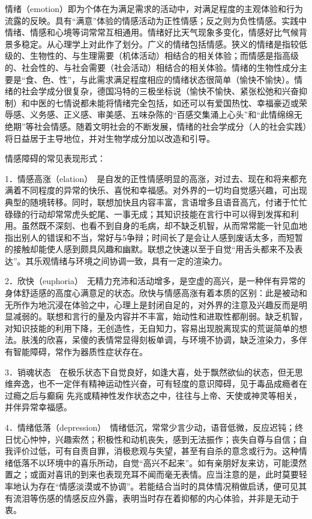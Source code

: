 情绪（emotion）即为个体在为满足需求的活动中，对满足程度的主观体验和行为流露的反映。具有“满意”体验的情感活动为正性情感；反之则为负性情感。实践中情绪、情感和心境等词常常互相通用。情绪好比天气现象多变化，情感好比气候背景多稳定。从心理学上对此作了划分。广义的情绪包括情感。狭义的情绪是指较低级的、生物性的、与生理需要（机体活动）相结合的相关体验；而情感是指高级的、社会性的、与社会需要（社会活动）相结合的相关体验。情绪的生物性成分主要是“食、色、性”，与此需求满足程度相应的情绪状态很简单（愉快不愉快）。情绪的社会学成分很复杂，德国冯特的三极坐标说（愉快不愉快、紧张松弛和兴奋抑制）和中医的七情说都未能将情绪完全包括，如还可以有爱国热忱、幸福豪迈或荣辱感、义务感、正义感、审美感、五味杂陈的“百感交集涌上心头”和“此情绵绵无绝期”等社会情感。随着文明社会的不断发展，情绪的社会学成分（人的社会实践）将日益居于主导地位，并对生物学成分加以改造和引导。

情感障碍的常见表现形式：

1．情感高涨（elation）　是自发的正性情感明显的高涨，对过去、现在和将来都充满着不同程度的异常的快乐、喜悦和幸福感。对外界的一切均自觉感兴趣，可出现典型的随境转移。同时，联想加快且内容丰富，言语增多且语音高亢，付诸于忙忙碌碌的行动却常常虎头蛇尾、一事无成；其知识技能在言行中可以得到发挥和利用。虽然既不深刻、也看不到自身的毛病，却不缺乏机智，从而常常能一针见血地指出别人的错误和不当，常好与5争辩；时间长了是会让人感到废话太多，而短暂的接触却能使人感到颇具风趣和幽默。联想之快速以至于自觉“用舌头都来不及表达”。其乐观情绪与环境之间协调一致，具有一定的渲染力。

2．欣快（euphoria）　无精力充沛和活动增多，是空虚的高兴，是一种伴有异常的身体舒适感的高度心满意足的状态。欣快与情感高涨有着本质的区别：此是被动和无所作为地沉浸在体验之中，心理上是封闭自足的，对外界的注意及兴趣反而是明显减弱的。联想和言行的量及内容并不丰富，始动性和进取性都削弱。缺乏机智，对知识技能的利用下降，无创造性，无自知力，容易出现脱离现实的荒诞简单的想法。肤浅的欣喜，呆傻的表情常显得刻板单调，与环境不协调，缺乏渲染力，多伴有智能障碍，常作为器质性症状存在。

3．销魂状态　在极乐状态下自觉良好，如逢大喜，处于飘然欲仙的状态，但无思维奔逸，也不一定伴有精神运动性兴奋，可有轻度的意识障碍，见于毒品成瘾者在过瘾之后与癫痫
先兆或精神性发作状态之中，往往与上帝、天使或神灵等相关，并伴异常幸福感。

4．情绪低落（depression）　情绪低沉，常常少言少动，语音低微，反应迟钝；终日忧心忡忡，兴趣索然；积极性和动机丧失，感到无法振作；丧失自尊与自信；自我评价过低，可有自责自罪，消极悲观与失望，甚至有自杀的意念或行为。这种情绪低落不以环境中的喜乐所动，自觉“高兴不起来”。如有亲朋好友来访，可能漠然置之；或面对喜讯的到来也表现充耳不闻而毫无表情。应当注意的是，此时莫要轻率地认为存在“情感淡漠或不协调”。若能结合当时的具体情况稍做启诱，便可见其有流泪等伤感的情感反应外露，表明当时存在着抑郁的内心体验，并非是无动于衷。

